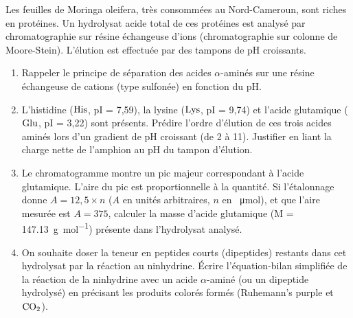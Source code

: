 \documentclass[11pt]{article}
\begin{document}
\begin{exercice}
Les feuilles de Moringa oleifera, très consommées au Nord-Cameroun, sont riches en protéines. Un hydrolysat acide total de ces protéines est analysé par chromatographie sur résine échangeuse d'ions (chromatographie sur colonne de Moore-Stein). L'élution est effectuée par des tampons de pH croissants.
\begin{enumerate}
    \item Rappeler le principe de séparation des acides $\alpha$-aminés sur une résine échangeuse de cations (type sulfonée) en fonction du pH. 
    \item L'histidine ($\ce{His}$, pI = 7,59), la lysine ($\ce{Lys}$, pI = 9,74) et l'acide glutamique ($\ce{Glu}$, pI = 3,22) sont présents. Prédire l'ordre d'élution de ces trois acides aminés lors d'un gradient de pH croissant (de 2 à 11). Justifier en liant la charge nette de l'amphion au pH du tampon d'élution.
    \item Le chromatogramme montre un pic majeur correspondant à l'acide glutamique. L'aire du pic est proportionnelle à la quantité. Si l'étalonnage donne $A = 12,5 \times n$ ($A$ en unités arbitraires, $n$ en \SI{}{\micro\mole}), et que l'aire mesurée est $A = 375$, calculer la masse d'acide glutamique (M = \SI{147,13}{\gram\per\mole}) présente dans l'hydrolysat analysé.
    \item On souhaite doser la teneur en peptides courts (dipeptides) restants dans cet hydrolysat par la réaction au ninhydrine. Écrire l'équation-bilan simplifiée de la réaction de la ninhydrine avec un acide $\alpha$-aminé (ou un dipeptide hydrolysé) en précisant les produits colorés formés (Ruhemann's purple et $\ce{CO2}$).
\end{enumerate}
\end{exercice}
\end{document}

